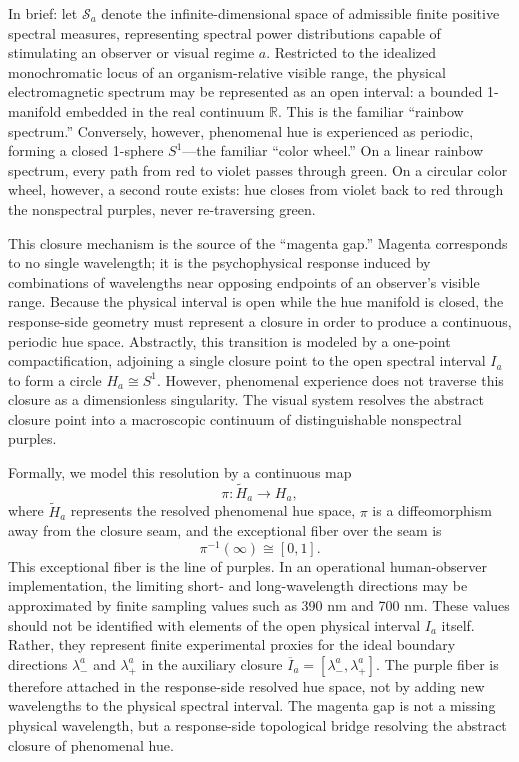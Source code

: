 \documentclass[preprint,12pt,authoryear]{elsarticle}
\theoremstyle{plain}
\theoremstyle{definition}
\theoremstyle{remark}
\begin{document}
In brief: let $\mathcal{S}_a$ denote the infinite-dimensional space of admissible finite positive spectral measures, representing spectral power distributions capable of stimulating an observer or visual regime $a$. Restricted to the idealized monochromatic locus of an organism-relative visible range, the physical electromagnetic spectrum may be represented as an open interval: a bounded 1-manifold embedded in the real continuum $\mathbb{R}$. This is the familiar ``rainbow spectrum.'' Conversely, however, phenomenal hue is experienced as periodic, forming a closed 1-sphere $S^1$---the familiar ``color wheel.'' On a linear rainbow spectrum, every path from red to violet passes through green. On a circular color wheel, however, a second route exists: hue closes from violet back to red through the nonspectral purples, never re-traversing green.

This closure mechanism is the source of the ``magenta gap.'' Magenta corresponds to no single wavelength; it is the psychophysical response induced by combinations of wavelengths near opposing endpoints of an observer's visible range. Because the physical interval is open while the hue manifold is closed, the response-side geometry must represent a closure in order to produce a continuous, periodic hue space. Abstractly, this transition is modeled by a one-point compactification, adjoining a single closure point to the open spectral interval $I_a$ to form a circle $H_a\cong S^1$. However, phenomenal experience does not traverse this closure as a dimensionless singularity. The visual system resolves the abstract closure point into a macroscopic continuum of distinguishable nonspectral purples.

Formally, we model this resolution by a continuous map
\[
\pi:\widetilde{H}_a\longrightarrow H_a,
\]
where $\widetilde{H}_a$ represents the resolved phenomenal hue space, $\pi$ is a diffeomorphism away from the closure seam, and the exceptional fiber over the seam is
\[
\pi^{-1}(\infty)\cong [0,1].
\]
This exceptional fiber is the line of purples. In an operational human-observer implementation, the limiting short- and long-wavelength directions may be approximated by finite sampling values such as 390 nm and 700 nm. These values should not be identified with elements of the open physical interval \(I_a\) itself. Rather, they represent finite experimental proxies for the ideal boundary directions \(\lambda_-^a\) and \(\lambda_+^a\) in the auxiliary closure \(\overline I_a=[\lambda_-^a,\lambda_+^a]\). The purple fiber is therefore attached in the response-side resolved hue space, not by adding new wavelengths to the physical spectral interval. The magenta gap is not a missing physical wavelength, but a response-side topological bridge resolving the abstract closure of phenomenal hue.
\end{document}
